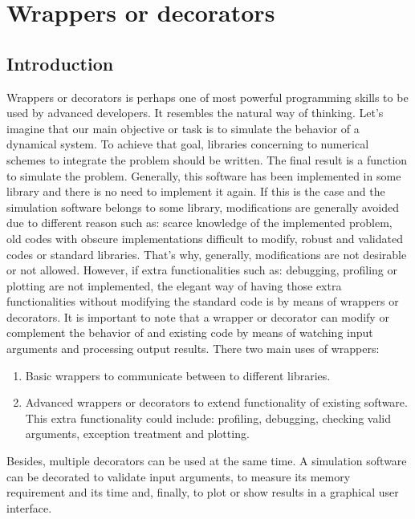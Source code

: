 

\chapter{Wrappers or decorators} 

\vspace{-1cm} 
\section{Introduction} 
\vspace{-0.5cm}
Wrappers or decorators is perhaps one of most powerful  
programming skills to be used by advanced developers. 
It resembles the natural way of thinking.
Let's imagine that our main objective or task is to simulate 
the behavior of a dynamical system. To achieve that goal, libraries 
concerning to numerical schemes to integrate the problem should be written.
The final result is a function to simulate the problem. 
Generally, this software has been implemented in some library and there is no 
need to implement it again. 
If this is the case and the simulation software belongs to some library,
modifications are generally avoided due to different reason such as: 
scarce knowledge of the implemented problem, old codes with 
obscure implementations difficult to modify, robust and validated codes
or standard libraries. That's why, generally,  
modifications are not desirable or not allowed. 
However, if extra 
functionalities such as:  debugging, profiling or plotting  
are not implemented, the elegant way of having those extra functionalities
without modifying the standard code is by means of wrappers or decorators. 
It is important to note that a wrapper or decorator can modify or complement 
the behavior of and existing code by means of watching input arguments and
processing output results. 
There two main uses of wrappers: 
\vspace{-0.5cm}
\begin{enumerate}
\setlength\itemsep{0cm}
\item Basic wrappers to communicate between to different libraries.
\item Advanced wrappers or decorators to extend 
functionality of existing software. This extra functionality could include:
 profiling, debugging, checking valid arguments, exception treatment and plotting. 
\end{enumerate} 
Besides, multiple decorators  can be used at the same time. A simulation software can
be decorated to validate input arguments, to measure its memory requirement and 
its time and, finally, to plot or show results in a graphical user interface. 

